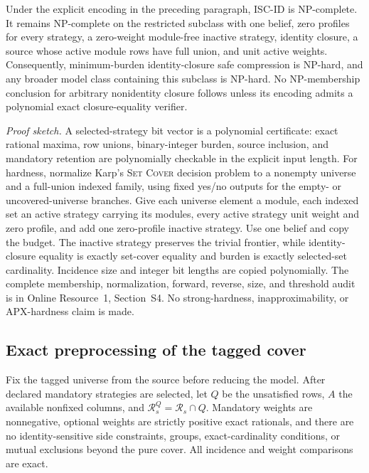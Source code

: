 \begin{theorem}
\label{thm:aor-safe-compression-complexity}
Under the explicit encoding in the preceding paragraph,
\textnormal{\textsc{ISC-ID}} is NP-complete.  It remains NP-complete on the
restricted subclass with one belief, zero profiles for every strategy, a
zero-weight module-free inactive strategy, identity closure, a source whose
active module rows have full union, and unit active weights.  Consequently,
minimum-burden identity-closure safe compression is NP-hard, and any broader
model class containing this subclass is NP-hard.  No NP-membership conclusion
for arbitrary nonidentity closure follows unless its encoding admits a
polynomial exact closure-equality verifier.
\end{theorem}

\noindent\emph{Proof sketch.}
A selected-strategy bit vector is a polynomial certificate: exact rational
maxima, row unions, binary-integer burden, source inclusion, and mandatory
retention are polynomially checkable in the explicit input length.  For
hardness, normalize Karp's \textsc{Set Cover} decision problem
\citep{Karp1972} to a nonempty universe and a full-union indexed family, using
fixed yes/no outputs for the empty- or uncovered-universe branches.  Give each
universe element a module, each indexed set an active strategy carrying its
modules, every active strategy unit weight and zero profile, and add one
zero-profile inactive strategy.  Use one belief and copy the budget.  The
inactive strategy preserves the trivial frontier, while identity-closure
equality is exactly set-cover equality and burden is exactly selected-set
cardinality.  Incidence size and integer bit lengths are copied polynomially.
The complete membership, normalization, forward, reverse, size, and threshold
audit is in Online Resource~1, Section~S4.  No strong-hardness,
inapproximability, or APX-hardness claim is made.

\subsection{Exact preprocessing of the tagged cover}
\label{subsec:aor-preprocessing}

Fix the tagged universe from the source before reducing the model.  After
declared mandatory strategies are selected, let \(Q\) be the unsatisfied rows,
\(A\) the available nonfixed columns, and
\(\mathcal R_s^Q=\mathcal R_s\cap Q\).  Mandatory weights are nonnegative,
optional weights are strictly positive exact rationals, and there are no
identity-sensitive side constraints, groups, exact-cardinality conditions, or
mutual exclusions beyond the pure cover.  All incidence and weight
comparisons are exact.

